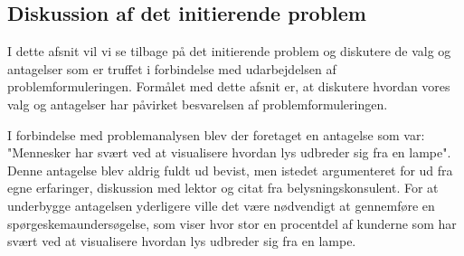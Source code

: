  \subsection{Diskussion af det initierende problem}

I dette afsnit vil vi se tilbage på det initierende problem og diskutere de valg og antagelser som er truffet i forbindelse med udarbejdelsen af problemformuleringen. Formålet med dette afsnit er, at diskutere hvordan vores valg og antagelser har påvirket besvarelsen af problemformuleringen. 

I forbindelse med problemanalysen blev der foretaget en antagelse som var: "Mennesker har svært ved at visualisere hvordan lys udbreder sig fra en lampe". Denne antagelse blev aldrig fuldt ud bevist, men istedet argumenteret for ud fra egne erfaringer, diskussion med lektor og citat fra belysningskonsulent. For at underbygge antagelsen yderligere ville det være nødvendigt at gennemføre en spørgeskemaundersøgelse, som viser hvor stor en procentdel af kunderne som har svært ved at visualisere hvordan lys udbreder sig fra en lampe. 

\clearpage